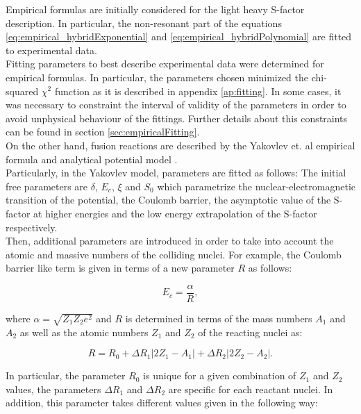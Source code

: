 \documentclass[openany]{book}
\begin{document}
Empirical formulas are initially considered for the light heavy S-factor description. In particular, the non-resonant part of the equations \ref{eq:empirical_hybridExponential}  and \ref{eq:empirical_hybridPolynomial} are fitted to experimental data.  \\

Fitting parameters to best describe experimental data were determined for empirical formulas. In particular, the parameters chosen minimized the chi-squared $\chi^2$ function as it is described in appendix \ref{ap:fitting}. In some cases, it was necessary to constraint the interval of validity of the parameters in order to avoid unphysical behaviour of the fittings. Further details about this constraints can be found in section \ref{sec:empiricalFitting}. \\

On the other hand, fusion reactions are described by the Yakovlev et. al empirical formula \cite{beard_afanasjev_chamon_gasques_wiescher_yakovlev_2010} and analytical potential model  \cite{yakovlev_beard_gasques_wiescher_2010}.  \\

Particularly, in the Yakovlev model, parameters are fitted as follows: The initial free parameters are $\delta$, $E_c$,  $\xi$ and $S_0$ which parametrize the nuclear-electromagnetic transition of the potential, the Coulomb barrier, the asymptotic value of the S-factor at higher energies and the low energy extrapolation of the S-factor respectively.  \\

Then, additional parameters are introduced in order to take into account the atomic and massive numbers of the colliding nuclei. For example, the Coulomb barrier like term is given in terms of a new parameter $R$ as follows:

\begin{equation} \label{eq:potential_Yakovlev_Ec}
	E_c = \frac{\alpha}{R},
\end{equation}

where $\alpha = \sqrt{Z_1Z_2e^2}$ and $R$ is determined in terms of the mass numbers $A_1$ and $A_2$ as well as the atomic numbers $Z_1$ and $Z_2$ of the reacting nuclei as:

\begin{equation} \label{eq:potential_Yakovlev_R}
	R = R_0 + \Delta R_{1} |2Z_1 - A_1| + \Delta R_{2}|2Z_2 - A_2|.
\end{equation}

In particular, the parameter $R_0$ is unique for a given combination of $Z_1$ and $Z_2$ values,  the parameters $\Delta R_{1}$ and $\Delta R_{2}$ are specific for each reactant nuclei. In addition, this parameter takes different values given in the following way: 
\end{document}
